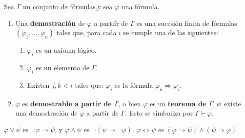\documentclass[12pt]{report}
\newcounter{it}
\theoremstyle{largebreak}
\begin{document}
    \begin{mydef}
        Sea $\Gamma$ un conjunto de fórmulas,y sea $\varphi$ una fórmula.
        \begin{enumerate}
            \item Una \textbf{demostración} de $\varphi$ a partifr de $\Gamma$ es una sucesión finita de fórmulas $\left(\varphi_1,...,\varphi_n\right)$ tales que, para cada $i$ se cumple una de las siguientes:
            \begin{enumerate}
                \item $\varphi_i$ es un axioma lógico.
                \item $\varphi_i$ es un elemento de $\Gamma$.
                \item Existen $j,k<i$ tales que: $\varphi_j$ es la fórmula $\varphi_k\Rightarrow\varphi_i$.
            \end{enumerate}
            \item $\varphi$ es \textbf{demostrable a partir de $\Gamma$}, o bien $\varphi$ es un \textbf{teorema de $\Gamma$}, si existe una demostración de $\varphi$ a partir de $\Gamma$. Esto se simboliza por $\Gamma\vdash\varphi$. 
        \end{enumerate}
    \end{mydef}

    \begin{obs}
        $\varphi\lor\psi$ es $\neg\varphi\Rightarrow\psi$, y $\varphi\land\psi$ es $\neg(\psi\Rightarrow\neg \varphi)$.
        $\varphi\iff\psi$ es $(\varphi\Rightarrow \psi)\land( \psi\Rightarrow\varphi)$
    \end{obs}
\end{document}
